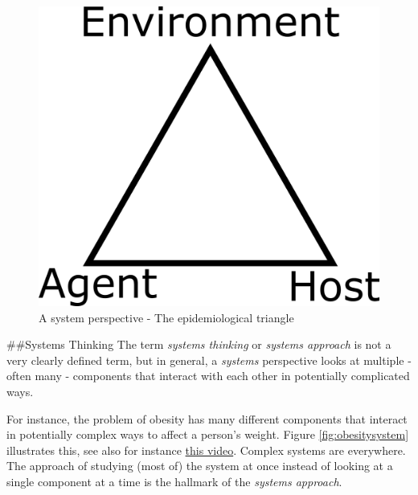\documentclass[]{book}
\theoremstyle{definition}
\theoremstyle{definition}
\theoremstyle{definition}
\theoremstyle{remark}
\begin{document}
\begin{figure}
\centering
\includegraphics{./images/epi-triangle.png}
\caption{\label{fig:epitriangle}A system perspective - The epidemiological
triangle}
\end{figure}

\#\#Systems Thinking The term \emph{systems thinking} or \emph{systems
approach} is not a very clearly defined term, but in general, a
\emph{systems} perspective looks at multiple - often many - components
that interact with each other in potentially complicated ways.

For instance, the problem of obesity has many different components that
interact in potentially complex ways to affect a person's weight. Figure
\ref{fig:obesitysystem} illustrates this, see also for instance
\href{https://youtu.be/2vojPksdbtI}{this video}. Complex systems are
everywhere. The approach of studying (most of) the system at once
instead of looking at a single component at a time is the hallmark of
the \emph{systems approach}.
\end{document}
